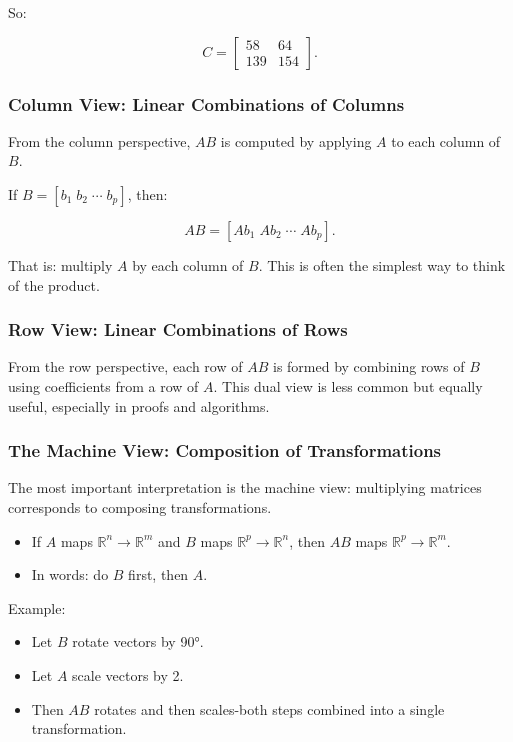 \documentclass[
  letterpaper,
  DIV=11,
  numbers=noendperiod]{scrreprt}
\providecommand{\tightlist}{%
  \setlength{\itemsep}{0pt}\setlength{\parskip}{0pt}}
\begin{document}
So:

\[
C = 
\begin{bmatrix} 
58 & 64 \\ 
139 & 154 
\end{bmatrix}.
\]

\subsubsection{Column View: Linear Combinations of
Columns}\label{column-view-linear-combinations-of-columns}

From the column perspective, \(AB\) is computed by applying \(A\) to
each column of \(B\).

If \(B = [b_1 \; b_2 \; \cdots \; b_p]\), then:

\[
AB = [A b_1 \; A b_2 \; \cdots \; A b_p].
\]

That is: multiply \(A\) by each column of \(B\). This is often the
simplest way to think of the product.

\subsubsection{Row View: Linear Combinations of
Rows}\label{row-view-linear-combinations-of-rows}

From the row perspective, each row of \(AB\) is formed by combining rows
of \(B\) using coefficients from a row of \(A\). This dual view is less
common but equally useful, especially in proofs and algorithms.

\subsubsection{The Machine View: Composition of
Transformations}\label{the-machine-view-composition-of-transformations}

The most important interpretation is the machine view: multiplying
matrices corresponds to composing transformations.

\begin{itemize}
\tightlist
\item
  If \(A\) maps \(\mathbb{R}^n \to \mathbb{R}^m\) and \(B\) maps
  \(\mathbb{R}^p \to \mathbb{R}^n\), then \(AB\) maps
  \(\mathbb{R}^p \to \mathbb{R}^m\).
\item
  In words: do \(B\) first, then \(A\).
\end{itemize}

Example:

\begin{itemize}
\tightlist
\item
  Let \(B\) rotate vectors by 90°.
\item
  Let \(A\) scale vectors by 2.
\item
  Then \(AB\) rotates and then scales-both steps combined into a single
  transformation.
\end{itemize}
\end{document}
